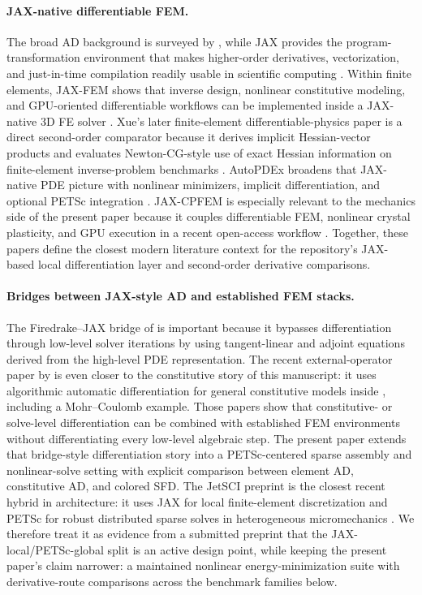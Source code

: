 \paragraph{JAX-native differentiable FEM.}
The broad AD background is surveyed by \citet{baydin2018autodiff}, while JAX
provides the program-transformation environment that makes higher-order
derivatives, vectorization, and just-in-time compilation readily usable in
scientific computing \citep{jax2018}. Within finite elements, JAX-FEM shows that
inverse design, nonlinear constitutive modeling, and GPU-oriented differentiable
workflows can be implemented inside a JAX-native 3D FE solver
\citep{xue2023jaxfem}. Xue's later finite-element differentiable-physics paper
is a direct second-order comparator because it derives implicit Hessian-vector
products and evaluates Newton-CG-style use of exact Hessian information on
finite-element inverse-problem benchmarks \citep{xue2026implicit}. AutoPDEx
broadens that JAX-native PDE picture with nonlinear minimizers, implicit
differentiation, and optional PETSc integration \citep{bode2025autopdex}.
JAX-CPFEM is especially relevant to the mechanics side of the present paper
because it couples differentiable FEM, nonlinear crystal plasticity, and GPU
execution in a recent open-access workflow \citep{hu2025jaxcpfem}. Together,
these papers define the closest modern literature context for the repository's
JAX-based local differentiation layer and second-order derivative comparisons.

\paragraph{Bridges between JAX-style AD and established FEM stacks.}
The Firedrake--JAX bridge of \citet{yashchuk2023bringing} is important because
it bypasses differentiation through low-level solver iterations by using
tangent-linear and adjoint equations derived from the high-level PDE
representation. The recent  external-operator paper by
\citet{latyshev2025externaloperators} is even closer to the constitutive story
of this manuscript: it uses algorithmic automatic differentiation for general
constitutive models inside , including a Mohr--Coulomb example.
Those papers show that constitutive- or solve-level differentiation can be
combined with established FEM environments without differentiating every low-level
algebraic step. The present paper extends that bridge-style differentiation
story into a PETSc-centered sparse assembly and nonlinear-solve setting with
explicit comparison between element AD, constitutive AD, and colored SFD. The
JetSCI preprint is the closest recent hybrid in architecture: it uses JAX for
local finite-element discretization and PETSc for robust distributed sparse
solves in heterogeneous micromechanics \citep{cattaneo2026jetsci}. We therefore
treat it as evidence from a submitted preprint that the JAX-local/PETSc-global
split is an active design point, while keeping the present paper's claim
narrower: a maintained nonlinear energy-minimization suite with derivative-route
comparisons across the benchmark families below.

